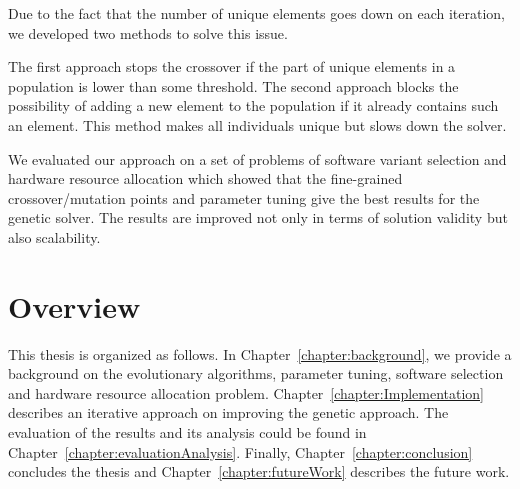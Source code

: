 Due to the fact that the number of unique elements goes down on each iteration, we developed two methods to solve this issue.

The first approach stops the crossover if the part of unique elements in a population is lower than some threshold.
The second approach blocks the possibility of adding a new element to the population if it already contains such an element. This method makes all individuals unique but slows down the solver.

We evaluated our approach on a set of problems of software variant selection and hardware resource allocation which showed that the fine-grained crossover/mutation points and parameter tuning give the best results for the genetic solver. The results are improved not only in terms of solution validity but also scalability.


\section{Overview}
This thesis is organized as follows. In Chapter~\ref{chapter:background}, we provide a background on the evolutionary algorithms, parameter tuning,  software selection and hardware resource allocation problem. Chapter~\ref{chapter:Implementation} describes an iterative approach on improving the genetic approach. The evaluation of the results and its analysis could be found in Chapter~\ref{chapter:evaluationAnalysis}. Finally, Chapter~\ref{chapter:conclusion} concludes the thesis and Chapter~\ref{chapter:futureWork} describes the future work.
